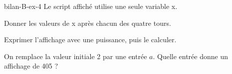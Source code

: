 \begin{blocEdition}{bilan-B-ex-4}
Le script affiché utilise une seule variable x.\begin{questions}
\item Donner les valeurs de x après chacun des quatre tours.
\item Exprimer l’affichage avec une puissance, puis le calculer.
\item On remplace la valeur initiale 2 par une entrée $a$. Quelle entrée donne un affichage de 405 ?
\end{questions}\label{fig-bilan-B-ex-4}
\par{}\par\par{}\par{}\par{}\par{}\par{}\par{}
\end{blocEdition}
